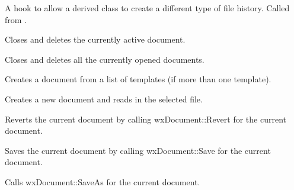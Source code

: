 
A hook to allow a derived class to create a different type of file history. Called
from .


\label{wxdocmanageronfileclose}


Closes and deletes the currently active document.


\label{wxdocmanageronfilecloseall}


Closes and deletes all the currently opened documents.


\label{wxdocmanageronfilenew}


Creates a document from a list of templates (if more than one template).


\label{wxdocmanageronfileopen}


Creates a new document and reads in the selected file.


\label{wxdocmanageronfilerevert}


Reverts the current document by calling wxDocument::Revert for the current document.


\label{wxdocmanageronfilesave}


Saves the current document by calling wxDocument::Save for the current document.


\label{wxdocmanageronfilesaveas}


Calls wxDocument::SaveAs for the current document.


\label{wxdocmanagerremovedocument}

